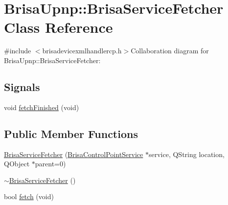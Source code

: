 \hypertarget{classBrisaUpnp_1_1BrisaServiceFetcher}{
\section{BrisaUpnp::BrisaServiceFetcher Class Reference}
\label{classBrisaUpnp_1_1BrisaServiceFetcher}
}


{\ttfamily \#include $<$brisadevicexmlhandlercp.h$>$}Collaboration diagram for BrisaUpnp::BrisaServiceFetcher:\subsection*{Signals}
\begin{DoxyCompactItemize}
\item 
void \hyperlink{classBrisaUpnp_1_1BrisaServiceFetcher_a042c718c5a096a861c1a6a9cd68233ed}{fetchFinished} (void)
\end{DoxyCompactItemize}
\subsection*{Public Member Functions}
\begin{DoxyCompactItemize}
\item 
\hyperlink{classBrisaUpnp_1_1BrisaServiceFetcher_ab4596a7635b72f64a75448d9968f93e9}{BrisaServiceFetcher} (\hyperlink{classBrisaUpnp_1_1BrisaControlPointService}{BrisaControlPointService} $\ast$service, QString location, QObject $\ast$parent=0)
\item 
\hyperlink{classBrisaUpnp_1_1BrisaServiceFetcher_ad45170ce91026bba8f30043b8835e623}{$\sim$BrisaServiceFetcher} ()
\item 
bool \hyperlink{classBrisaUpnp_1_1BrisaServiceFetcher_ab2f4e2752cd9bb75c1fdcf77895fdd1e}{fetch} (void)
\end{DoxyCompactItemize}


